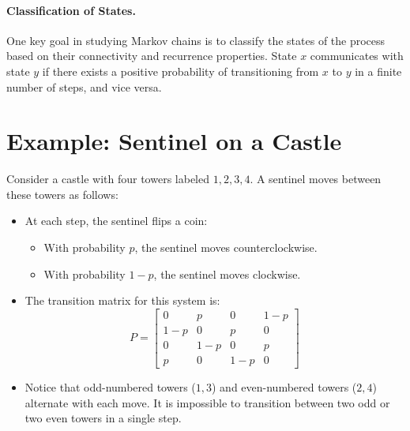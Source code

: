 \paragraph{Classification of States.}
One key goal in studying Markov chains is to classify the states of the process based on their connectivity and recurrence properties. State \( x \) communicates with state \( y \) if there exists a positive probability of transitioning from \( x \) to \( y \) in a finite number of steps, and vice versa.

\section{Example: Sentinel on a Castle}
\begin{center}
\end{center}

Consider a castle with four towers labeled \( 1, 2, 3, 4 \). A sentinel moves between these towers as follows:
\begin{itemize}
    \item At each step, the sentinel flips a coin:
        \begin{itemize}
            \item With probability \( p \), the sentinel moves counterclockwise.
            \item With probability \( 1-p \), the sentinel moves clockwise.
        \end{itemize}
    \item The transition matrix for this system is:
        \[
        P =
        \begin{bmatrix}
        0 & p & 0 & 1-p \\
        1-p & 0 & p & 0 \\
        0 & 1-p & 0 & p \\
        p & 0 & 1-p & 0
        \end{bmatrix}
        \]
    \item Notice that odd-numbered towers (\( 1, 3 \)) and even-numbered towers (\( 2, 4 \)) alternate with each move. It is impossible to transition between two odd or two even towers in a single step.
\end{itemize}


